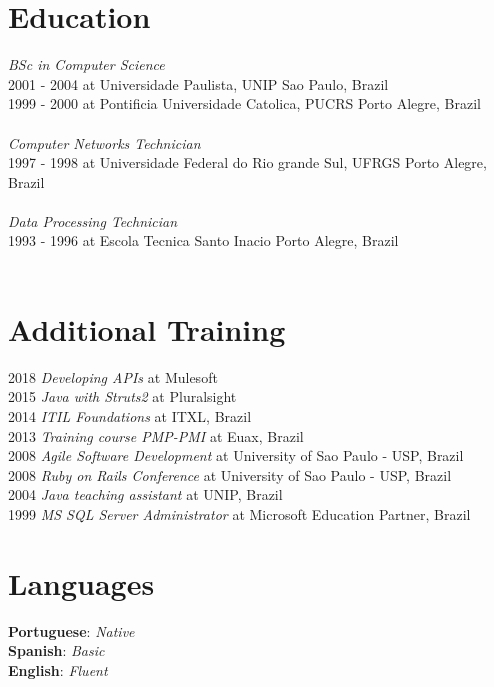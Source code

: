 \documentclass[margin]{res}
\begin{document}
\begin{resume}
\section{Education}
    \textit{BSc in Computer Science} \\
      2001 - 2004 at {Universidade Paulista, UNIP} \hfill {Sao Paulo, Brazil} \\
      1999 - 2000 at {Pontificia Universidade Catolica, PUCRS} \hfill {Porto Alegre, Brazil} \\
    \\
    \textit{Computer Networks Technician} \\
      1997 - 1998 at {Universidade Federal do Rio grande Sul, UFRGS} \hfill {Porto Alegre, Brazil} \\
    \\
    \textit{Data Processing Technician} \\
      1993 - 1996 at {Escola Tecnica Santo Inacio} \hfill {Porto Alegre, Brazil} \\
    \\

\section{Additional Training}
    2018 \textit{Developing APIs} at {Mulesoft} \\
    2015 \textit{Java with Struts2} at {Pluralsight} \\
    2014 \textit{ITIL Foundations} at {ITXL, Brazil} \\
    2013 \textit{Training course PMP-PMI} at {Euax, Brazil} \\
    2008 \textit{Agile Software Development} at {University of Sao Paulo - USP, Brazil} \\
    2008 \textit{Ruby on Rails Conference} at {University of Sao Paulo - USP, Brazil} \\
    2004 \textit{Java teaching assistant} at {UNIP, Brazil} \\
    1999 \textit{MS SQL Server Administrator} at {Microsoft Education Partner, Brazil} \\

\section{Languages} 
    \textbf{Portuguese}: \textit{Native} \\
    \textbf{Spanish}: \textit{Basic} \\
    \textbf{English}: \textit{Fluent} \\


\end{resume}
\end{document}
